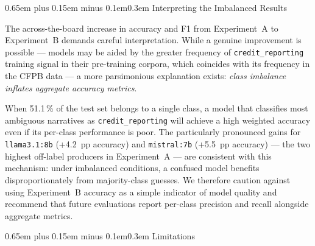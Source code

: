 \documentclass[10pt,a4paper,twocolumn]{article}
\makeatletter
\renewcommand\subsection{\@startsection{subsection}{2}{0pt}%
  {0.65em plus 0.15em minus 0.1em}{0.3em}%
  {\normalfont\normalsize\itshape}}
\makeatother
\begin{document}
\subsection{Interpreting the Imbalanced Results}

The across-the-board increase in accuracy and F1 from Experiment~A
to Experiment~B demands careful interpretation. While a genuine
improvement is possible --- models may be aided by the greater
frequency of \texttt{credit\_reporting} training signal in
their pre-training corpora, which coincides with its frequency in
the CFPB data --- a more parsimonious explanation exists:
\emph{class imbalance inflates aggregate accuracy metrics}.

When 51.1\,\% of the test set belongs to a single class, a model
that classifies most ambiguous narratives as \texttt{credit\_reporting}
will achieve a high weighted accuracy even if its per-class performance
is poor. The particularly pronounced gains for \texttt{llama3.1:8b}
(+4.2~pp accuracy) and \texttt{mistral:7b} (+5.5~pp accuracy) --- the
two highest off-label producers in Experiment~A --- are consistent
with this mechanism: under imbalanced conditions, a confused model
benefits disproportionately from majority-class guesses. We therefore
caution against using Experiment~B accuracy as a simple indicator of
model quality and recommend that future evaluations report per-class
precision and recall alongside aggregate metrics.

\subsection{Limitations}
\end{document}
